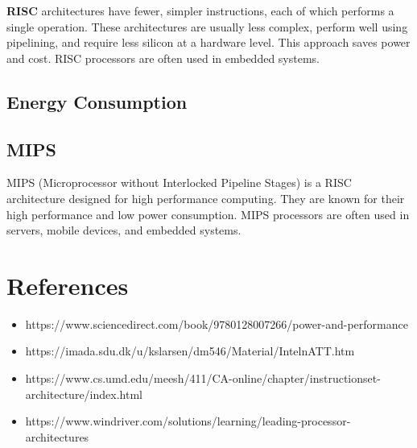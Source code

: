 \textbf{RISC} architectures have fewer, simpler instructions, each of which performs a single operation. These architectures are usually less complex, perform well using pipelining, and require less silicon at a hardware level. This approach saves power and cost. RISC processors are often used in embedded systems.

\subsection{Energy Consumption}

\subsection{MIPS}

MIPS (Microprocessor without Interlocked Pipeline Stages) is a RISC architecture designed for high performance computing. They are known for their high performance and low power consumption. MIPS processors are often used in servers, mobile devices, and embedded systems.

\section{References}

\begin{itemize}
	\item https://www.sciencedirect.com/book/9780128007266/power-and-performance
	\item https://imada.sdu.dk/u/kslarsen/dm546/Material/IntelnATT.htm
	\item https://www.cs.umd.edu/meesh/411/CA-online/chapter/instructionset-
	architecture/index.html
	\item https://www.windriver.com/solutions/learning/leading-processor-architectures
\end{itemize}